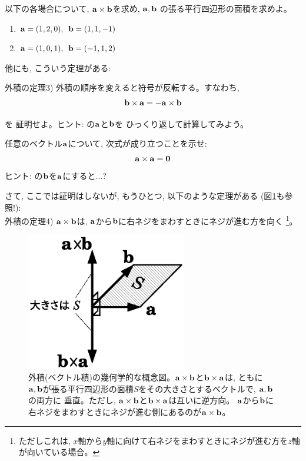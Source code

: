\begin{q}\label{q:univ_vectprod0} 以下の各場合について, 
${\bf a}\times{\bf b}$を求め, ${\bf a}, {\bf b}$
の張る平行四辺形の面積を求めよ。
\begin{enumerate}
\item ${\bf a}=(1, 2, 0),\,\,\, {\bf b}=(1, 1, -1)$
\item ${\bf a}=(1, 0, 1),\,\,\, {\bf b}=(-1, 1, 2)$
\end{enumerate}\end{q}\hv

他にも, こういう定理がある:\hv

外積の定理3) 外積の順序を変えると符号が反転する。すなわち, 
\begin{eqnarray}
{\bf b}\times{\bf a}=-{\bf a}\times{\bf b}\label{eq:vectprod_order}
\end{eqnarray}

\begin{q}\label{q:vectprod_order} を
証明せよ。ヒント: の${\bf a}$と${\bf b}$を
ひっくり返して計算してみよう。\end{q}\hv

\begin{q}\label{q:vectprod_same} 任意のベクトル${\bf a}$について, 
次式が成り立つことを示せ:
\begin{eqnarray}
{\bf a}\times{\bf a}={\bf 0}\label{eq:vectprod_same}
\end{eqnarray}
ヒント: の${\bf b}$を${\bf a}$にすると...?\end{q}
\hv

さて, ここでは証明はしないが, もうひとつ, 以下のような定理がある
(図\ref{fig:vector_prod}も参照!):\\

外積の定理4) ${\bf a}\times{\bf b}$は, ${\bf a}$から${\bf b}$に右ネジをまわすときにネジが進む方を向く
\footnote{ただしこれは, $x$軸から$y$軸に向けて右ネジをまわすときにネジが進む方を$z$軸が向いている場合。}。\\
\begin{figure}
    \centering
      \includegraphics[width=7cm]{vector_prod.eps}
      \caption{外積(ベクトル積)の幾何学的な概念図。${\bf a}\times{\bf b}$と${\bf b}\times{\bf a}$は, ともに
${\bf a}, {\bf b}$が張る平行四辺形の面積$S$をその大きさとするベクトルで, ${\bf a}, {\bf b}$の両方に
垂直。ただし, ${\bf a}\times{\bf b}$と${\bf b}\times{\bf a}$は互いに逆方向。
${\bf a}$から${\bf b}$に右ネジをまわすときにネジが進む側にあるのが${\bf a}\times{\bf b}$。
\label{fig:vector_prod}}    
\end{figure}\hv

